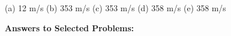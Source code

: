 \begin{Answer}
(a) 12 m/s (b) 353 m/s (c) 353 m/s (d) 358 m/s (e) 358 m/s
\end{Answer}


\bigskip\bigskip\bigskip
\pagebreak[3]
\textbf{Answers to Selected {\thesubsection} Problems:}
\label{galilean_relativity_prob_answers}
\shipoutAnswer

\cleardoublepage